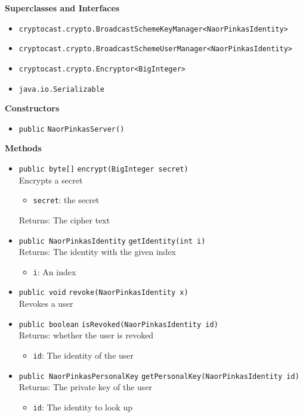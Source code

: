\textbf{Superclasses and Interfaces}
\begin{itemize}
\item \lstinline|cryptocast.crypto.BroadcastSchemeKeyManager<NaorPinkasIdentity>|
\item \lstinline|cryptocast.crypto.BroadcastSchemeUserManager<NaorPinkasIdentity>|
\item \lstinline|cryptocast.crypto.Encryptor<BigInteger>|
\item \lstinline|java.io.Serializable|
\end{itemize}



\textbf{Constructors}
\begin{itemize}
\item \lstinline|public| \lstinline|NaorPinkasServer|\lstinline|()|




\end{itemize}


\textbf{Methods}
\begin{itemize}
\item \lstinline|public byte[]| \lstinline|encrypt|\lstinline|(BigInteger secret)|\\
Encrypts a secret
\begin{itemize}
\item \lstinline|secret|: the secret
\end{itemize}

Returns: The cipher text

\item \lstinline|public NaorPinkasIdentity| \lstinline|getIdentity|\lstinline|(int i)|\\
Returns: The identity with the given index
\begin{itemize}
\item \lstinline|i|: An index
\end{itemize}



\item \lstinline|public void| \lstinline|revoke|\lstinline|(NaorPinkasIdentity x)|\\
Revokes a user



\item \lstinline|public boolean| \lstinline|isRevoked|\lstinline|(NaorPinkasIdentity id)|\\
Returns: whether the user is revoked
\begin{itemize}
\item \lstinline|id|: The identity of the user
\end{itemize}



\item \lstinline|public NaorPinkasPersonalKey| \lstinline|getPersonalKey|\lstinline|(NaorPinkasIdentity id)|\\
Returns: The private key of the user
\begin{itemize}
\item \lstinline|id|: The identity to look up
\end{itemize}



\end{itemize}

